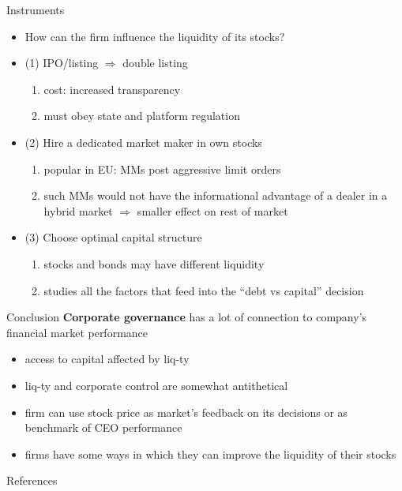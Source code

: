 \documentclass[english,10pt
,aspectratio=169
]{beamer}
\begin{document}
\begin{frame}{Instruments}
	\begin{itemize}
		\item How can the firm influence the liquidity of its stocks?
		\item (1) IPO/listing $\Rightarrow$ double listing
		\begin{enumerate}
			\item cost: increased transparency
			\item must obey state and platform regulation
		\end{enumerate}
		\item (2) Hire a dedicated market maker in own stocks
		\begin{enumerate}
			\item popular in EU: MMs post aggressive limit orders
			\item such MMs would not have the informational advantage of a dealer in a hybrid market $\Rightarrow$ smaller effect on rest of market
		\end{enumerate}
		\item (3) Choose optimal capital structure
		\begin{enumerate}
			\item stocks and bonds may have different liquidity
			\item {} studies all the factors that feed into the ``debt vs capital'' decision
		\end{enumerate}
	\end{itemize}
\end{frame}


\begin{frame}{Conclusion}
	\textbf{Corporate governance} has a lot of connection to company's financial market performance
	\begin{itemize}
		\item access to capital affected by liq-ty
		\item liq-ty and corporate control are somewhat antithetical
		\item firm can use stock price as market's feedback on its decisions or as benchmark of CEO performance
		\item firms have some ways in which they can improve the liquidity of their stocks
	\end{itemize}
\end{frame}


\appendix
\begin{frame}[allowframebreaks]{References}
	
	
\end{frame}
\end{document}
